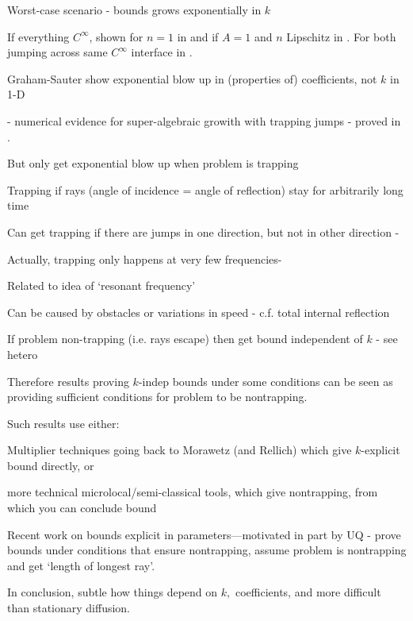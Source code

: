 \item Worst-case scenario - bounds grows exponentially in $k$
\bit
\item If everything $C^\infty$, shown for $n=1$ in \cite{Bu:02} and if $A=1$ and $n$ Lipschitz in \cite{Sh:17}. For both jumping across same $C^\infty$ interface in \cite{Be:02}.
\item Graham-Sauter \cite{GrSa:18} show exponential blow up in (properties of) coefficients, not $k$ in 1-D
\item \cite{MoSp:19} - numerical evidence for super-algebraic growith with trapping jumps - proved in \cite{PoVo:99a,PoVo99b,CaPoVo:99}.
\eit
\item But only get exponential blow up when problem is trapping
\item Trapping if rays (angle of incidence = angle of reflection) stay for arbitrarily long time
\item Can get trapping if there are jumps in one direction, but not in other direction - \cite{MoSp:19}
\item Actually, trapping only happens at very few frequencies-\cite{MoSp:19,LaSpWu:19}
\item Related to idea of `resonant frequency'
\item Can be caused by obstacles or variations in speed - c.f. total internal reflection
\item If problem non-trapping (i.e. rays escape) then get bound independent of $k$ - see hetero
\item Therefore results proving $k$-indep bounds under some conditions can be seen as providing sufficient conditions for problem to be nontrapping.
\item Such results use either:
\bit
\item Multiplier techniques going back to Morawetz (and Rellich)  which give $k$-explicit bound directly, or
\item more technical microlocal/semi-classical tools, which give nontrapping, from which you can conclude bound
\item Recent work on bounds explicit in parameters---motivated in part by UQ - \cite{FeLiLo:15,GrPeSp:18,PeSp:18} prove bounds under conditions that ensure nontrapping, \cite{GaSpWu:18} assume problem is nontrapping and get `length of longest ray'.
\eit
\item In conclusion, subtle how things depend on $k,$ coefficients, and more difficult than stationary diffusion.
\eit

